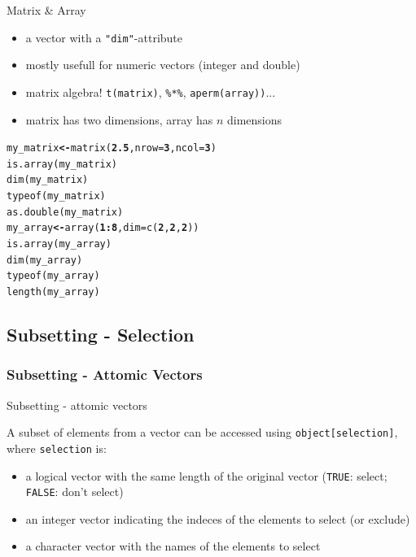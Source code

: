 \documentclass{beamer}\usepackage[]{graphicx}\usepackage[]{color}
\makeatletter
\newcommand{\hlnum}[1]{\textcolor[rgb]{0.502,0,0.502}{\textbf{#1}}}%
\newcommand{\hlopt}[1]{\textcolor[rgb]{1,0,0.502}{\textbf{#1}}}%
\newcommand{\hlstd}[1]{\textcolor[rgb]{0,0,0}{#1}}%
\newcommand{\hlkwb}[1]{\textcolor[rgb]{0.502,0.502,0.753}{\textbf{#1}}}%
\newcommand{\hlkwc}[1]{\textcolor[rgb]{0,0.502,0.753}{#1}}%
\newcommand{\hlkwd}[1]{\textcolor[rgb]{0,0.267,0.4}{#1}}%
\newenvironment{kframe}{%
 \def\at@end@of@kframe{}%
 \ifinner\ifhmode%
  \def\at@end@of@kframe{\end{minipage}}%
  \begin{minipage}{\columnwidth}%
 \fi\fi%
 \def\FrameCommand##1{\hskip\@totalleftmargin \hskip-\fboxsep
 \colorbox{shadecolor}{##1}\hskip-\fboxsep
     \hskip-\linewidth \hskip-\@totalleftmargin \hskip\columnwidth}%
 \MakeFramed {\advance\hsize-\width
   \@totalleftmargin\z@ \linewidth\hsize
   \@setminipage}}%
 {\par\unskip\endMakeFramed%
 \at@end@of@kframe}
\newenvironment{knitrout}{}{} %
\makeatother
\begin{document}
\begin{frame}[fragile]{Matrix \& Array}

\begin{itemize}
  \item a vector with a \texttt{"dim"}-attribute
  \item mostly usefull for numeric vectors (integer and double)
  \item matrix algebra!  \texttt{t(matrix)}, \texttt{\%*\%}, \texttt{aperm(array))}...
  \item matrix has two dimensions, array has $n$ dimensions
\end{itemize}

\begin{knitrout}
\color{fgcolor}\begin{kframe}
\begin{alltt}
\hlstd{my_matrix} \hlkwb{<-} \hlkwd{matrix}\hlstd{(}\hlnum{2.5}\hlstd{,} \hlkwc{nrow} \hlstd{=} \hlnum{3}\hlstd{,} \hlkwc{ncol} \hlstd{=} \hlnum{3}\hlstd{)}
\hlkwd{is.array}\hlstd{(my_matrix)}
\hlkwd{dim}\hlstd{(my_matrix)}
\hlkwd{typeof}\hlstd{(my_matrix)}
\hlkwd{as.double}\hlstd{(my_matrix)}
\hlstd{my_array} \hlkwb{<-} \hlkwd{array}\hlstd{(}\hlnum{1}\hlopt{:}\hlnum{8}\hlstd{,} \hlkwc{dim} \hlstd{=} \hlkwd{c}\hlstd{(}\hlnum{2}\hlstd{,} \hlnum{2}\hlstd{,} \hlnum{2}\hlstd{))}
\hlkwd{is.array}\hlstd{(my_array)}
\hlkwd{dim}\hlstd{(my_array)}
\hlkwd{typeof}\hlstd{(my_array)}
\hlkwd{length}\hlstd{(my_array)}
\end{alltt}
\end{kframe}
\end{knitrout}

\end{frame}


\subsection{Subsetting - Selection}


\subsubsection{Subsetting - Attomic Vectors}


\begin{frame}[fragile]{Subsetting - attomic vectors}

A subset of elements from a vector can be accessed using \texttt{object[selection]}, where \texttt{selection} is:

\begin{itemize}
  \item a logical vector with the same length of the original vector (\texttt{TRUE}: select; \texttt{FALSE}: don't select)
  \item an integer vector indicating the indeces of the elements to select (or exclude)
  \item a character vector with the names of the elements to select
\end{itemize}

\end{frame}
\end{document}
